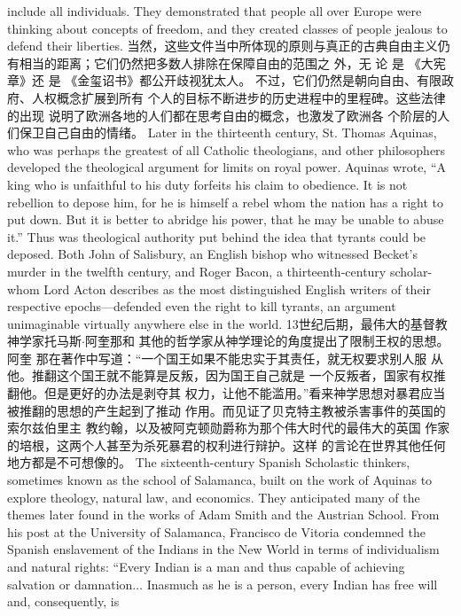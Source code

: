 \begin{paracol}{2}
include all individuals. They demonstrated that people all over
Europe were thinking about concepts of freedom, and they created classes of people jealous to defend their liberties.
\switchcolumn
当然，这些文件当中所体现的原则与真正的古典自由主义仍有相当的距离；它们仍然把多数人排除在保障自由的范围之
外，无 论 是 《大宪章》还 是 《金玺诏书》都公开歧视犹太人。
不过，它们仍然是朝向自由、有限政府、人权概念扩展到所有
个人的目标不断进步的历史进程中的里程碑。这些法律的出现
说明了欧洲各地的人们都在思考自由的概念，也激发了欧洲各
个阶层的人们保卫自己自由的情绪。
\switchcolumn*
Later in the thirteenth century, St. Thomas Aquinas, who
was perhaps the greatest of all Catholic theologians, and other
philosophers developed the theological argument for limits on
royal power. Aquinas wrote, ``A king who is unfaithful to his
duty forfeits his claim to obedience. It is not rebellion to depose
him, for he is himself a rebel whom the nation has a right to put
down. But it is better to abridge his power, that he may be unable to abuse it.'' Thus was theological authority put behind the
idea that tyrants could be deposed. Both John of Salisbury, an
English bishop who witnessed Becket's murder in the twelfth
century, and Roger Bacon, a thirteenth-century scholar-whom Lord Acton describes as the most distinguished English
writers of their respective epochs---defended even the right to
kill tyrants, an argument unimaginable virtually anywhere else
in the world.
\switchcolumn
13世纪后期，最伟大的基督教神学家托马斯$\cdot$阿奎那和
其他的哲学家从神学理论的角度提出了限制王权的思想。阿奎
那在著作中写道：“一个国王如果不能忠实于其责任，就无权要求别人服
从他。推翻这个国王就不能算是反叛，因为国王自己就是
一个反叛者，国家有权推翻他。但是更好的办法是剥夺其
权力，让他不能滥用。”看来神学思想对暴君应当被推翻的思想的产生起到了推动
作用。而见证了贝克特主教被杀害事件的英国的索尔兹伯里主
教约翰，以及被阿克顿勋爵称为那个伟大时代的最伟大的英国
作家的培根，这两个人甚至为杀死暴君的权利进行辩护。这样
的言论在世界其他任何地方都是不可想像的。
\switchcolumn*
The sixteenth-century Spanish Scholastic thinkers, sometimes known as the school of Salamanca, built on the work of
Aquinas to explore theology, natural law, and economics. They
anticipated many of the themes later found in the works of
Adam Smith and the Austrian School. From his post at the University of Salamanca, Francisco de Vitoria condemned the Spanish enslavement of the Indians in the New World in terms of individualism and natural rights: ``Every Indian is a man and thus
capable of achieving salvation or damnation$\ldots$ Inasmuch as
he is a person, every Indian has free will and, consequently, is

\end{paracol}
